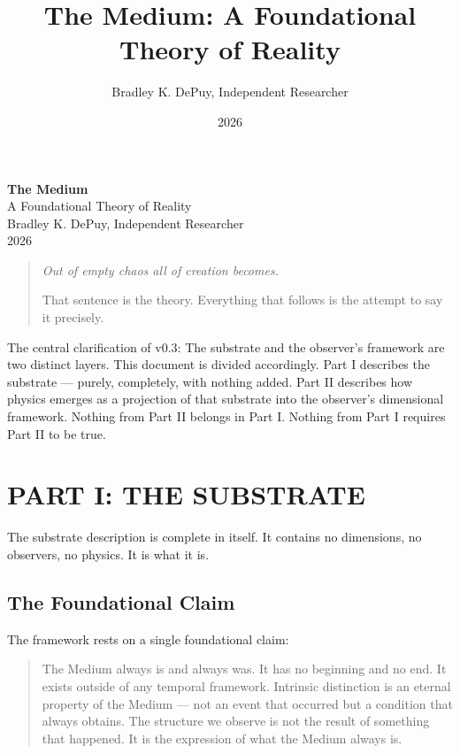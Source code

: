 \documentclass[11pt,letterpaper]{article}
\author{Bradley K. DePuy, Independent Researcher}
\date{2026}
\title{The Medium: A Foundational Theory of Reality}
\begin{document}
\pagestyle{plain}
\begin{titlepage}
\vspace*{4cm}
\begin{center}
  {\LARGE\bfseries The Medium}\\[0.6em]
  {\large A Foundational Theory of Reality}\\[2.5em]
  {\normalsize Bradley K. DePuy, Independent Researcher}\\[0.5em]
  {\normalsize 2026}
\end{center}
\end{titlepage}

\pagestyle{plain}
\tableofcontents
\clearpage

\pagestyle{body}

\begin{quote}
\emph{Out of empty chaos all of creation becomes.}

That sentence is the theory. Everything that follows is the attempt to say it precisely.
\end{quote}

The central clarification of v0.3: The substrate and the observer's framework are two distinct layers. This document is divided accordingly. Part I describes the substrate --- purely, completely, with nothing added. Part II describes how physics emerges as a projection of that substrate into the observer's dimensional framework. Nothing from Part II belongs in Part I. Nothing from Part I requires Part II to be true.
\section{PART I: THE SUBSTRATE}
\label{sec:org63e7f4d}

The substrate description is complete in itself. It contains no dimensions, no observers, no physics. It is what it is.
\subsection{The Foundational Claim}
\label{sec:orgb11557e}

The framework rests on a single foundational claim:

\begin{quote}
The Medium always is and always was. It has no beginning and no end. It exists outside of any temporal framework. Intrinsic distinction is an eternal property of the Medium --- not an event that occurred but a condition that always obtains. The structure we observe is not the result of something that happened. It is the expression of what the Medium always is.
\end{quote}
\end{document}
